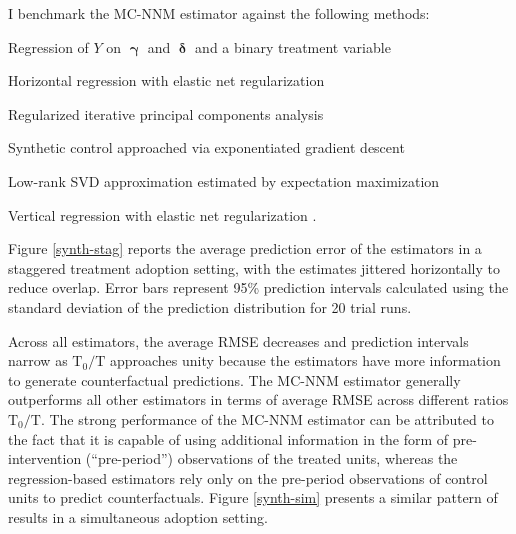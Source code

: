 I benchmark the MC-NNM estimator against the following methods:

\begin{description}
		{\setlength\itemindent{1mm}
			\item[(a) DID] Regression of $Y$ on $\boldsymbol{\upgamma}$ and $\boldsymbol{\updelta}$ and a binary treatment variable \citep{athey2017matrix}
			\item[(b) HR-EN] Horizontal regression with elastic net regularization \citep{athey2017matrix} 
			\item[(c) PCA] Regularized iterative principal components analysis \citep{ilin2010practical}
			\item[(d) SC-ADH] Synthetic control approached via exponentiated gradient descent \citep{abadie2010synthetic}
			\item[(e) SVD] Low-rank SVD approximation estimated by expectation maximization \citep{troyanskaya2001missing}
			\item[(f) VT-EN] Vertical regression with elastic net regularization \citep{athey2017matrix}.
		}
\end{description}

Figure \ref{synth-stag} reports the average prediction error of the estimators in a staggered treatment adoption setting, with the estimates jittered horizontally to reduce overlap. Error bars represent 95\% prediction intervals calculated using the standard deviation of the prediction distribution for 20 trial runs. 

Across all estimators, the average RMSE decreases and prediction intervals narrow as $\text{T}_0/\text{T}$ approaches unity because the estimators have more information to generate counterfactual predictions. The MC-NNM estimator generally outperforms all other estimators in terms of average RMSE across different ratios $\text{T}_0/\text{T}$.  The strong performance of the MC-NNM estimator can be attributed to the fact that it is capable of using additional information in the form of pre-intervention (``pre-period'') observations of the treated units, whereas the regression-based estimators rely only on the pre-period observations of control units to predict counterfactuals. Figure \ref{synth-sim} presents a similar pattern of results in a simultaneous adoption setting.

